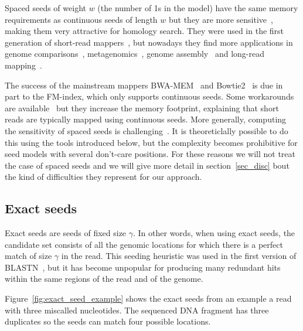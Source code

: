\documentclass{article}
\begin{document}
Spaced seeds of weight $w$ (the number of 1s in the model) have the same
memory requirements as continuous seeds of length $w$ but they are more
sensitive~\cite{li2006superiority}, making them very attractive for
homology search. They were used in the first generation of short-read
mappers~\cite{pmid18684737, pmid19461883, pmid19675096, pmid2945724}, but
nowadays they find more applications in genome
comparisons~\cite{pmid21209072, healy2016flak},
metagenomics~\cite{pmid26209798, pmid27540266}, genome
assembly~\cite{pmid26539459} and long-read mapping~\cite{pmid27079541}.

The success of the mainstream mappers BWA-MEM~\cite{li2013aligning} and
Bowtie2~\cite{pmid22388286} is due in part to the FM-index, which only
supports continuous seeds. Some workarounds are
available~\cite{horton2008dislex, gagie2017compressed} but they increase
the memory footprint, explaining that short reads are typically mapped
using continuous seeds. More generally, computing the sensitivity of
spaced seeds is challenging~\cite{pmid16819802, li2006superiority,
martin2017faster}. It is theoreticlally possible to do this using the
tools introduced below, but the complexity becomes prohibitive for seed
models with several don't-care positions. For these reasons we will not
treat the case of spaced seeds and we will give more detail in
section~\ref{sec_disc} bout the kind of difficulties they represent for
our approach.

\subsection{Exact seeds}

Exact seeds are seeds of fixed size $\gamma$. In other words, when using
exact seeds, the candidate set consists of all the genomic locations for
which there is a perfect match of size $\gamma$ in the read. This seeding
heuristic was used in the first version of BLASTN~\cite{pmid2231712}, but
it has become unpopular for producing many redundant hits within the same
regions of the read and of the genome.

Figure~\ref{fig:exact_seed_example} shows the exact seeds from an example
a read with three miscalled nucleotides. The sequenced DNA fragment has
three duplicates so the seeds can match four possible locations.
\end{document}
